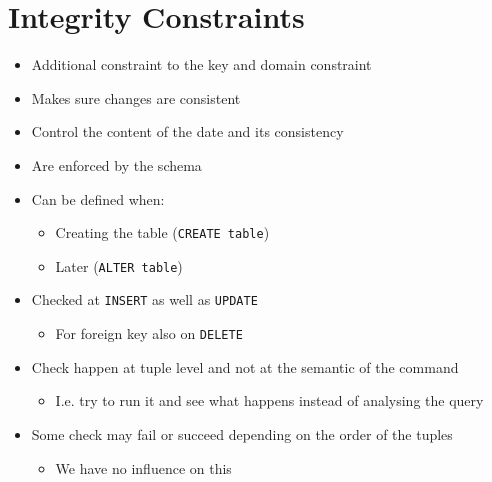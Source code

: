 
\section{Integrity Constraints}
\begin{itemize}
    \item Additional constraint to the key and domain constraint
    \item Makes sure changes are consistent
    \item Control the content of the date and its consistency
    \item Are enforced by the schema
    \item Can be defined when:
        \begin{itemize}
            \item Creating the table (\verb+CREATE table+)
            \item Later (\verb+ALTER table+)
        \end{itemize}
    \item Checked at \verb+INSERT+ as well as \verb+UPDATE+
        \begin{itemize}
            \item For foreign key also on \verb+DELETE+
        \end{itemize}
    \item Check happen at tuple level and not at the semantic of the command
        \begin{itemize}
            \item I.e. try to run it and see what happens instead of analysing the query
        \end{itemize}
    \item Some check may fail or succeed depending on the order of the tuples
        \begin{itemize}
            \item We have no influence on this
        \end{itemize}
\end{itemize}

